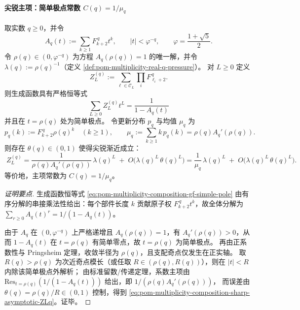 \paragraph{尖锐主项：简单极点常数 \texorpdfstring{$C(q)=1/\mu_q$}{C(q)=1/mu\_q}}
\begin{proposition}[整参矩配分函数的简单极点常数与尖锐主项]\label{prop:pom-multiplicity-composition-sharp-main-term-constant}
取实数 \(q\ge 0\)，并令
\[
A_q(t):=\sum_{k\ge 1}F_{k+2}^{\,q}t^k,\qquad |t|<\varphi^{-q},
\qquad \varphi=\frac{1+\sqrt5}{2}.
\]
令 \(\rho(q)\in(0,\varphi^{-q})\) 为方程 \(A_q(\rho(q))=1\) 的唯一解，并令 \(\lambda(q):=\rho(q)^{-1}\)（定义 \ref{def:pom-multiplicity-real-q-pressure}）。
对 \(L\ge 0\) 定义
\[
Z_L^{(q)}:=\sum_{\boldsymbol{\ell}\in\mathcal{C}_L}\prod_i F_{\ell_i+2}^{\,q}.
\]
则生成函数具有严格恒等式
\begin{equation}\label{eq:pom-multiplicity-composition-gf-simple-pole}
\boxed{\;
\sum_{L\ge 0}Z_L^{(q)}t^L=\frac{1}{1-A_q(t)}\;}
\end{equation}
并且在 \(t=\rho(q)\) 处为简单极点。
令更新分布 \(p_q\) 与均值 \(\mu_q\) 为
\[
p_q(k):=F_{k+2}^{\,q}\rho(q)^k\quad(k\ge 1),
\qquad
\mu_q:=\sum_{k\ge 1}k\,p_q(k)=\rho(q)A_q'(\rho(q)).
\]
则存在 \(\theta(q)\in(0,1)\) 使得尖锐渐近成立：
\begin{equation}\label{eq:pom-multiplicity-composition-sharp-asymptotic-ZLq}
\boxed{\;
Z_L^{(q)}=\frac{1}{\rho(q)A_q'(\rho(q))}\,\lambda(q)^{L}\;+\;O\!\bigl(\lambda(q)^L\,\theta(q)^{L}\bigr)
=\frac{1}{\mu_q}\,\lambda(q)^{L}\;+\;O\!\bigl(\lambda(q)^L\,\theta(q)^{L}\bigr).}
\end{equation}
等价地，主项常数为 \(C(q)=1/\mu_q\)。
\end{proposition}
\begin{proof}[证明要点]
生成函数恒等式 \eqref{eq:pom-multiplicity-composition-gf-simple-pole} 由有序分解的串接乘法性给出：每个部件长度 \(k\) 贡献原子权 \(F_{k+2}^{\,q}t^k\)，故全体分解为 \(\sum_{r\ge 0}A_q(t)^r=1/(1-A_q(t))\)。
\par
由于 \(A_q\) 在 \((0,\varphi^{-q})\) 上严格递增且 \(A_q(\rho(q))=1\)，有 \(A_q'(\rho(q))>0\)，从而 \(1-A_q(t)\) 在 \(t=\rho(q)\) 有简单零点，故 \(t=\rho(q)\) 为简单极点。
再由正系数性与 Pringsheim 定理，收敛半径为 \(\rho(q)\)，且支配奇点仅发生在正实轴。
取 \(R(q)>\rho(q)\) 为次近奇点模长（或任取 \(R\in(\rho(q),R(q))\)），则在 \(|t|<R\) 内除该简单极点外解析；
由标准留数/传递定理，系数主项由 \(\mathrm{Res}_{t=\rho(q)}(1/(1-A_q(t)))\) 给出，即
\(
1/(\rho(q)A_q'(\rho(q)))
\)，
而误差由 \(\theta(q)=\rho(q)/R\in(0,1)\) 控制，得到 \eqref{eq:pom-multiplicity-composition-sharp-asymptotic-ZLq}。证毕。
\end{proof}

